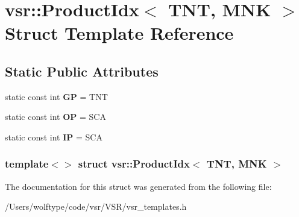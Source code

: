 \hypertarget{structvsr_1_1_product_idx_3_01_t_n_t_00_01_m_n_k_01_4}{\section{vsr\-:\-:Product\-Idx$<$ T\-N\-T, M\-N\-K $>$ Struct Template Reference}
\label{structvsr_1_1_product_idx_3_01_t_n_t_00_01_m_n_k_01_4}
}
\subsection*{Static Public Attributes}
\begin{DoxyCompactItemize}
\item 
\hypertarget{structvsr_1_1_product_idx_3_01_t_n_t_00_01_m_n_k_01_4_a1992e12f19ccb9bb003215b38aa5c734}{static const int {\bfseries G\-P} = T\-N\-T}\label{structvsr_1_1_product_idx_3_01_t_n_t_00_01_m_n_k_01_4_a1992e12f19ccb9bb003215b38aa5c734}

\item 
\hypertarget{structvsr_1_1_product_idx_3_01_t_n_t_00_01_m_n_k_01_4_a4ea8c741c45a8bdf946a33de7098f8f2}{static const int {\bfseries O\-P} = S\-C\-A}\label{structvsr_1_1_product_idx_3_01_t_n_t_00_01_m_n_k_01_4_a4ea8c741c45a8bdf946a33de7098f8f2}

\item 
\hypertarget{structvsr_1_1_product_idx_3_01_t_n_t_00_01_m_n_k_01_4_ab3a66f6a2aa2066d9fc1fe189879d987}{static const int {\bfseries I\-P} = S\-C\-A}\label{structvsr_1_1_product_idx_3_01_t_n_t_00_01_m_n_k_01_4_ab3a66f6a2aa2066d9fc1fe189879d987}

\end{DoxyCompactItemize}
\subsubsection*{template$<$$>$ struct vsr\-::\-Product\-Idx$<$ T\-N\-T, M\-N\-K $>$}



The documentation for this struct was generated from the following file\-:\begin{DoxyCompactItemize}
\item 
/\-Users/wolftype/code/vsr/\-V\-S\-R/vsr\-\_\-templates.\-h\end{DoxyCompactItemize}
